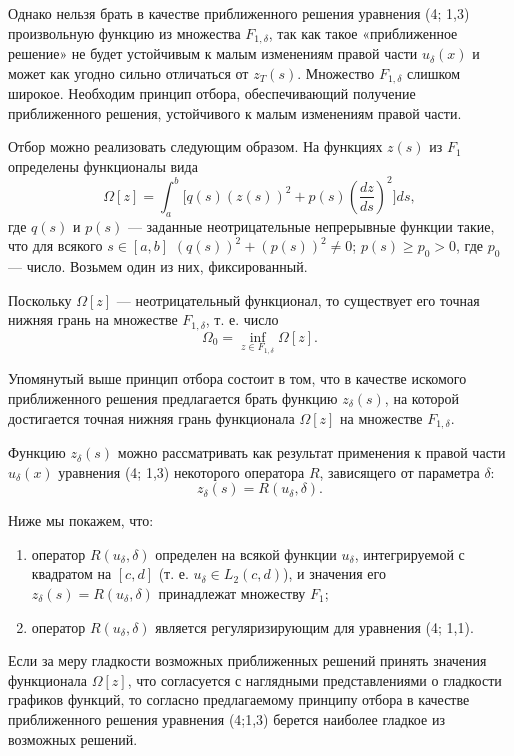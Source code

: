 \documentclass[a4paper,14pt]{extarticle}
\begin{document}
Однако нельзя брать в качестве приближенного решения уравнения (4; 1,3) произвольную функцию из множества \(F_{1,\delta}\), так как такое «приближенное решение» не будет устойчивым к малым изменениям правой части \(u_\delta(x)\) и может как угодно сильно отличаться от \(z_T(s)\). Множество \(F_{1,\delta}\) слишком широкое. Необходим принцип отбора, обеспечивающий получение приближенного решения, устойчивого к малым изменениям правой части.

Отбор можно реализовать следующим образом. На функциях \(z(s)\) из \(F_1\) определены функционалы вида
\begin{equation}
\Omega[z] = \int_a^b \bigl[ q(s) (z(s))^2 + p(s) (\frac{dz}{ds})^2 \bigr] ds, \tag{4; 1,4}
\end{equation}
где \(q(s)\) и \(p(s)\) — заданные неотрицательные непрерывные функции такие, что для всякого \(s \in [a,b]\) \((q(s))^2 + (p(s))^2 \ne 0\); \(p(s) \ge p_0 > 0\), где \(p_0\) — число. Возьмем один из них, фиксированный.

Поскольку \(\Omega[z]\) — неотрицательный функционал, то существует его точная нижняя грань на множестве \(F_{1,\delta}\), т. е. число
\[
\Omega_0 = \inf_{z \in F_{1,\delta}} \Omega[z].
\]

Упомянутый выше принцип отбора состоит в том, что в качестве искомого приближенного решения предлагается брать функцию \(z_\delta(s)\), на которой достигается точная нижняя грань функционала \(\Omega[z]\) на множестве \(F_{1,\delta}\).

Функцию \(z_\delta(s)\) можно рассматривать как результат применения к правой части \(u_\delta(x)\) уравнения (4; 1,3) некоторого оператора \(R\), зависящего от параметра \(\delta\):
\[
z_\delta(s) = R(u_\delta, \delta).
\]

Ниже мы покажем, что:
\begin{enumerate}
    \item оператор \(R(u_\delta, \delta)\) определен на всякой функции \(u_\delta\), интегрируемой с квадратом на \([c,d]\) (т. е. \(u_\delta \in L_2(c,d)\)), и значения его \(z_\delta(s) = R(u_\delta, \delta)\) принадлежат множеству \(F_1\);
    \item оператор \(R(u_\delta, \delta)\) является регуляризирующим для уравнения (4; 1,1).
\end{enumerate}

Если за меру гладкости возможных приближенных решений принять значения функционала \(\Omega[z]\), что согласуется с наглядными представлениями о гладкости графиков функций, то согласно предлагаемому принципу отбора в качестве приближенного решения уравнения (4;1,3) берется наиболее гладкое из возможных решений.
\end{document}
